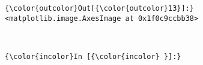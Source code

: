 \documentclass[11pt]{article}
\begin{document}
\begin{Verbatim}[commandchars=\\\{\}]
{\color{outcolor}Out[{\color{outcolor}13}]:} <matplotlib.image.AxesImage at 0x1f0c9ccbb38>
\end{Verbatim}
            
    \begin{center}
    \end{center}
    { \hspace*{\fill} \\}
    
    \begin{Verbatim}[commandchars=\\\{\}]
{\color{incolor}In [{\color{incolor} }]:} 
\end{Verbatim}



    
    
    
    
\end{document}
